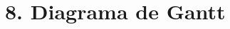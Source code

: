 \documentclass[11pt]{charter}
\begin{document}
\clearpage


\section{8. Diagrama de Gantt}
\label{sec:gantt}






\end{document}
